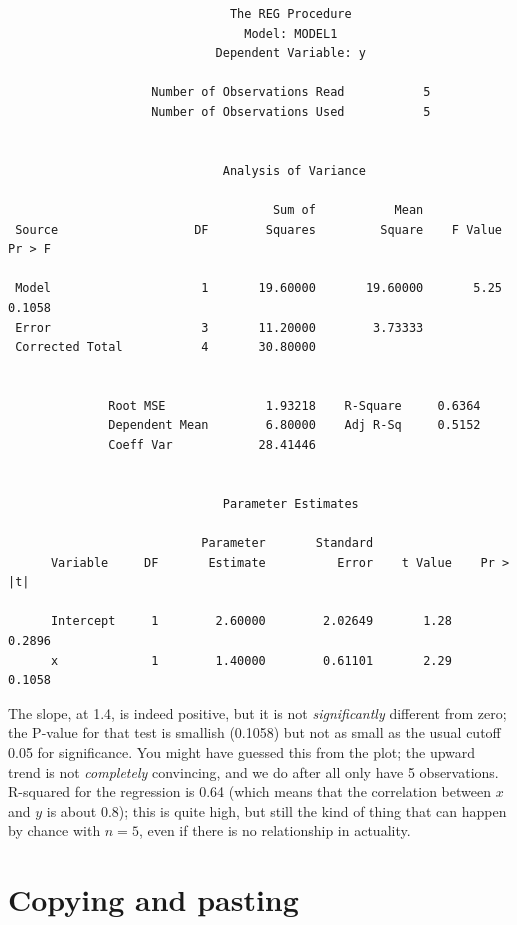 \documentclass[11pt]{article}
\begin{document}
{\footnotesize
\begin{verbatim}
                               The REG Procedure
                                 Model: MODEL1
                             Dependent Variable: y 

                    Number of Observations Read           5
                    Number of Observations Used           5


                              Analysis of Variance
 
                                     Sum of           Mean
 Source                   DF        Squares         Square    F Value    Pr > F

 Model                     1       19.60000       19.60000       5.25    0.1058
 Error                     3       11.20000        3.73333                     
 Corrected Total           4       30.80000                                    


              Root MSE              1.93218    R-Square     0.6364
              Dependent Mean        6.80000    Adj R-Sq     0.5152
              Coeff Var            28.41446                       


                              Parameter Estimates
 
                           Parameter       Standard
      Variable     DF       Estimate          Error    t Value    Pr > |t|

      Intercept     1        2.60000        2.02649       1.28      0.2896
      x             1        1.40000        0.61101       2.29      0.1058
\end{verbatim}
}

\filbreak

The slope, at 1.4, is indeed positive, but it is not
\emph{significantly} different from zero; the P-value for that test is
smallish (0.1058) but not as small as the usual cutoff 0.05 for
significance. You might have guessed this from the plot; the upward
trend is not \emph{completely} convincing, and we do after all only
have 5 observations. R-squared for the regression is 0.64 (which means
that the correlation between $x$ and $y$ is about 0.8); this is quite
high, but still the kind of thing that can happen by chance with
$n=5$, even if there is no relationship in actuality.

\section{Copying and pasting}
\label{sec:copypaste}
\end{document}
